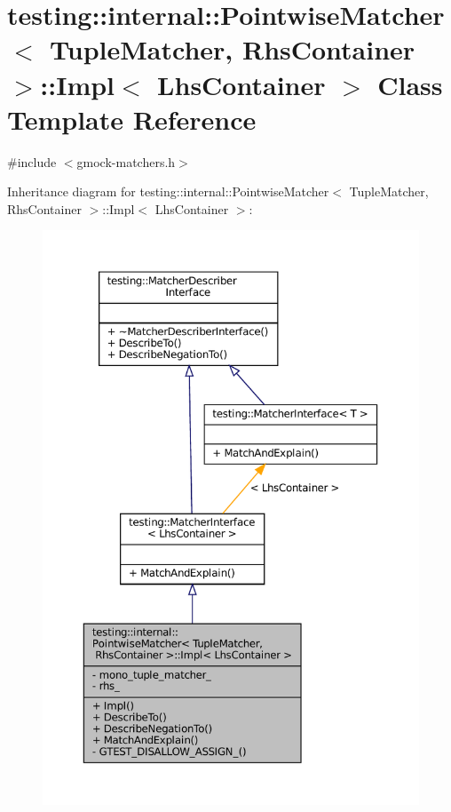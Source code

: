 \hypertarget{classtesting_1_1internal_1_1PointwiseMatcher_1_1Impl}{}\section{testing\+:\+:internal\+:\+:Pointwise\+Matcher$<$ Tuple\+Matcher, Rhs\+Container $>$\+:\+:Impl$<$ Lhs\+Container $>$ Class Template Reference}
\label{classtesting_1_1internal_1_1PointwiseMatcher_1_1Impl}


{\ttfamily \#include $<$gmock-\/matchers.\+h$>$}



Inheritance diagram for testing\+:\+:internal\+:\+:Pointwise\+Matcher$<$ Tuple\+Matcher, Rhs\+Container $>$\+:\+:Impl$<$ Lhs\+Container $>$\+:
\nopagebreak
\begin{figure}[H]
\begin{center}
\leavevmode
\includegraphics[width=350pt]{classtesting_1_1internal_1_1PointwiseMatcher_1_1Impl__inherit__graph}
\end{center}
\end{figure}


